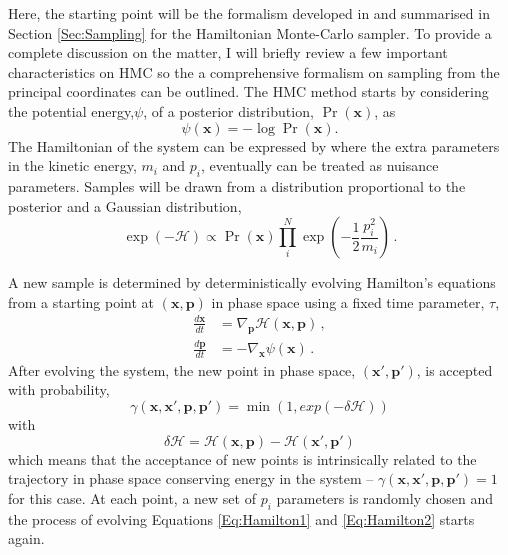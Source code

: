 \qquad Here, the starting point will be the formalism developed in \cite{Taylor2008,2013-GuidedHamiltonian} and summarised in Section \ref{Sec:Sampling} for the Hamiltonian Monte-Carlo sampler. To provide a complete discussion on the matter, I will briefly review a few important characteristics on HMC so the a comprehensive formalism on sampling from the principal coordinates can be outlined. The HMC method starts by considering the potential energy,$\psi$, of a posterior distribution, $\Pr(\bm{x})$, as
\begin{equation}
\label{eqn::ch1_log_post}
\psi(\mathbf{x})=-\log\Pr(\mathbf{x}).
\end{equation}
The Hamiltonian of the system can be expressed by
where the extra parameters in the kinetic energy, $m_i$ and $p_i$, eventually can  be treated as nuisance parameters. Samples will be drawn from a distribution proportional to the posterior and a Gaussian distribution,
\begin{equation}
\label{EQ:BPL:HMC_ExpH}
\exp(-\mathcal{H})\propto \Pr(\bm{x})\prod_i^N\exp\left(-\frac{1}{2}\frac{p_i^2}{m_i}\right)\, .
\end{equation}

\qquad A new sample is determined by deterministically evolving Hamilton's equations from a starting point at $(\bm{x},\bm{p})$ in phase space using a fixed time parameter, $\tau$,
\begin{align}
    \label{Eq:Hamilton1}
    \frac{d\bm{x}}{dt} & = \nabla_{\bm{p}}\mathcal{H}(\bm{x},\bm{p})\, , \\
    \label{Eq:Hamilton2}
    \frac{d\bm{p}}{dt} & = -\nabla_{\bm{x}}\psi(\bm{x}) \, .
\end{align}
After evolving the system, the new point in phase space, $(\bm{x}',\bm{p}')$, is accepted with probability,
\begin{equation}
    \gamma(\bm{x}, \bm{x}', \bm{p}, \bm{p}') = \min(1, exp(-\delta\mathcal{H}))
\end{equation}
with
\begin{equation}
\delta\mathcal{H} = \mathcal{H}(\bm{x}, \bm{p}) - \mathcal{H}(\bm{x}', \bm{p}')    
\end{equation}
which means that the acceptance of new points is intrinsically related to the trajectory in phase space conserving energy in the system -- $\gamma(\bm{x}, \bm{x}', \bm{p}, \bm{p}') = 1$ for this case. At each point, a new set of $p_i$ parameters is randomly chosen and the process of evolving Equations \eqref{Eq:Hamilton1} and \eqref{Eq:Hamilton2} starts again.

